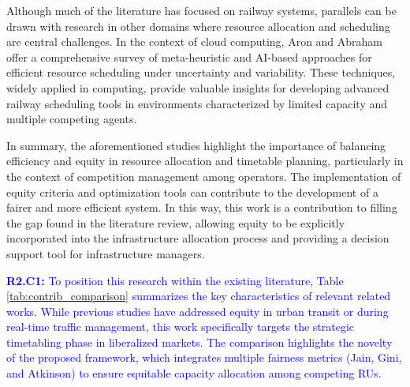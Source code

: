 \documentclass[preprint,12pt]{elsarticle}
\begin{document}
Although much of the literature has focused on railway systems, parallels can be drawn with research in other domains where resource allocation and scheduling are central challenges. In the context of cloud computing, Aron and Abraham \cite{Aron2022} offer a comprehensive survey of meta-heuristic and AI-based approaches for efficient resource scheduling under uncertainty and variability. These techniques, widely applied in computing, provide valuable insights for developing advanced railway scheduling tools in environments characterized by limited capacity and multiple competing agents. 

In summary, the aforementioned studies highlight the importance of balancing efficiency and equity in resource allocation and timetable planning, particularly in the context of competition management among operators. The implementation of equity criteria and optimization tools can contribute to the development of a fairer and more efficient system. In this way, this work is a contribution to filling the gap found in the literature review, allowing equity to be explicitly incorporated into the infrastructure allocation process and providing a decision support tool for infrastructure managers. 

\textcolor{blue}{\textbf{R2.C1:} To position this research within the existing literature, Table \ref{tab:contrib_comparison} summarizes the key characteristics of relevant related works. While previous studies have addressed equity in urban transit or during real-time traffic management, this work specifically targets the strategic timetabling phase in liberalized markets. The comparison highlights the novelty of the proposed framework, which integrates multiple fairness metrics (Jain, Gini, and Atkinson) to ensure equitable capacity allocation among competing \glspl{RU}.}
\end{document}
